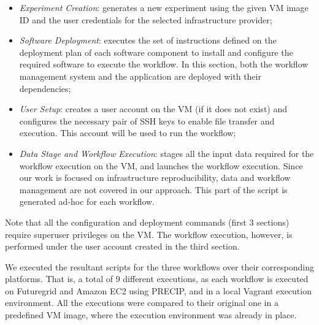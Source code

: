 \begin{itemize}
	\item \emph{Experiment Creation}: generates a new experiment using the 
		given VM image ID and the user credentials for the selected infrastructure 
		provider;
    	    
	\item \emph{Software Deployment}: executes the set of instructions defined on 
		the deployment plan of each software component to install and configure 
		the required software to execute the workflow. In this section, both the 
		workflow management system and the application are deployed with their 
		dependencies;

	\item \emph{User Setup}: creates a user account on the VM (if it does not exist) 
		and configures the necessary pair of SSH keys to enable file transfer and 
		execution. This account will be used to run the workflow;
	   
	\item \emph{Data Stage and Workflow Execution}: stages all the input data required 
		for the workflow execution on the VM, and launches the workflow execution. 
		Since our work is focused on infrastructure reproducibility, data and workflow 
		management are not covered in our approach. This part of the script is 
		generated ad-hoc for each workflow.
\end{itemize}

\noindent Note that all the configuration and deployment commands (first 3 sections) 
require superuser privileges on the VM. The workflow execution, however, is performed 
under the user account created in the third section.



We executed the resultant scripts for the three workflows over their corresponding 
platforms. That is, a total of 9 different executions, as each workflow is executed on  
Futuregrid and Amazon EC2 using PRECIP, and in a local Vagrant execution 
environment. All the executions were compared to their original one in a predefined 
VM image, where the execution environment was already in place.

